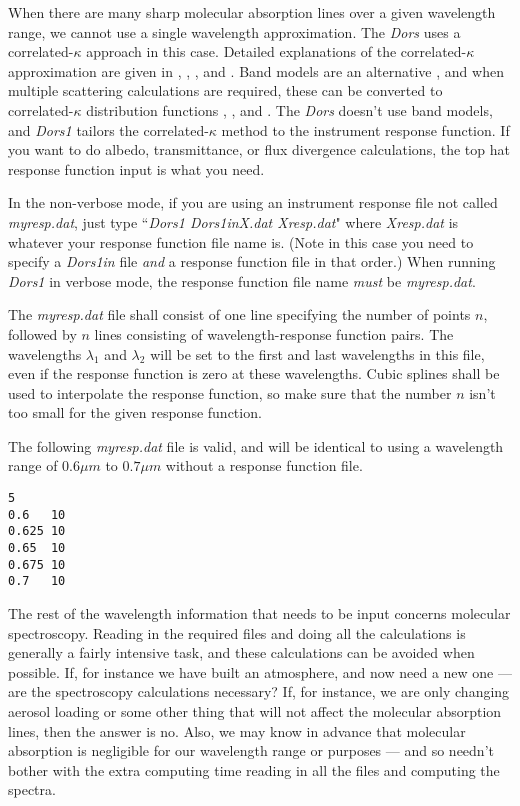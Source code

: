 \documentclass[12pt]{article}
\begin{document}
When there are many sharp molecular absorption lines over a given wavelength
range, we cannot use a single wavelength approximation.
The {\it Dors} uses a correlated-$\kappa$ approach in this case. 
Detailed explanations of the correlated-$\kappa$ approximation are given in \cite{GoodyWest:Mybib}, 
\cite{LacisOinas:Mybib}, \cite{FuLiou:Mybib}, and \cite{RoseKratz:Mybib}. 
Band models are an alternative \cite{GoodyYung:Mybib} \cite{Liou:Mybib},
and when multiple scattering calculations are required, these can be converted
to correlated-$\kappa$ distribution functions \cite{Goody:Mybib}, \cite{Domoto:Mybib}, and
 \cite{GodsalveBand:Mybib}. The {\it Dors} doesn't use band models, and {\it Dors1} tailors the correlated-$\kappa$ method 
 to the  instrument response function. If you want to do albedo, transmittance,
 or flux divergence calculations, the top hat response function input is
what you need.

In the non-verbose mode, if you are using an instrument response file not called {\it myresp.dat}, just 
type ``{\it Dors1 Dors1inX.dat Xresp.dat}" where {\it Xresp.dat} is whatever
your response function file name is. (Note in this case you need to specify a {\it Dors1in} file {\it and} a response function
file in that order.) When running {\it Dors1} in verbose
mode, the response function file name {\it must} be {\it myresp.dat}. 

 The {\it myresp.dat}  file  shall
consist of one line specifying the number of points $n$,
 followed by $n$ lines consisting
of wavelength-response function pairs. The wavelengths $\lambda_1$ and $\lambda_2$ will be
 set to the first and last wavelengths in this file, even if the
 response function is zero at these wavelengths.
Cubic splines shall be used to interpolate the response function, so make sure that the number $n$ isn't
too small for the given response function.

The following {\it myresp.dat} file is valid, and will be identical to using a wavelength 
range of $0.6\mu m$ to $0.7 \mu m$ without a response function file. 

\begin{verbatim}
5
0.6   10
0.625 10
0.65  10
0.675 10
0.7   10
\end{verbatim}

The rest of the wavelength information that needs to be input concerns molecular spectroscopy. Reading
in the required files and doing all the calculations 
is generally a fairly intensive task, and these calculations can be avoided when possible. If, for instance
we have built an atmosphere, and now need a new one  --- are the spectroscopy calculations necessary?
If, for instance,  we are only changing aerosol loading or some other thing that will not affect
the molecular absorption lines, then the answer is no. Also, we may know in advance that molecular absorption is negligible
 for our wavelength range or purposes --- and so needn't bother with the extra computing time reading in all the files and computing the spectra.
\end{document}
